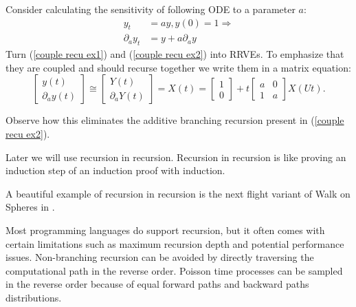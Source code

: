 \documentclass[a4paper,12pt]{article}
\begin{document}
\begin{example} \label{ex:coupled recursion}
  Consider calculating the
  sensitivity of following ODE to a
  parameter $a$:
  \begin{align}
    y_t             & =ay,y(0)=1 \Rightarrow \label{couple recu ex1} \\
    \partial_{a}y_t & = y + a \partial_{a}y \label{couple recu ex2}
  \end{align}
  Turn (\ref{couple recu ex1}) and (\ref{couple recu ex2}) into RRVEs.
  To emphasize that they are coupled and should
  recurse together we write them in a matrix equation:
  \begin{equation} \label{coupled mat}
    \begin{bmatrix}
      y(t) \\
      \partial_{a}y(t)
    \end{bmatrix} \cong
    \begin{bmatrix}
      Y(t) \\
      \partial_{a}Y(t)
    \end{bmatrix}=
    X(t)=
    \begin{bmatrix}
      1 \\
      0
    \end{bmatrix}+
    t \begin{bmatrix}
      a & 0 \\
      1 & a
    \end{bmatrix}
    X(Ut).
  \end{equation}

  Observe how this eliminates the additive branching recursion
  present in (\ref{couple recu ex2}).

\end{example}


\begin{technique}\label{tech:recu in recu}
  Later we will use recursion in recursion.
  Recursion in recursion is like proving an induction
  step of an induction proof with induction.
\end{technique}

\begin{related}
  A beautiful example of recursion in recursion is
  the next flight variant of Walk on Spheres in
  \cite{sawhney_grid-free_2022}.
\end{related}

Most programming languages do support recursion, but it often comes with certain
limitations such as maximum recursion depth and potential performance issues.
Non-branching recursion can be avoided by directly traversing the computational path in the
reverse order. Poisson time processes can be sampled in the reverse order
because of equal forward paths and backward paths distributions.
\end{document}
